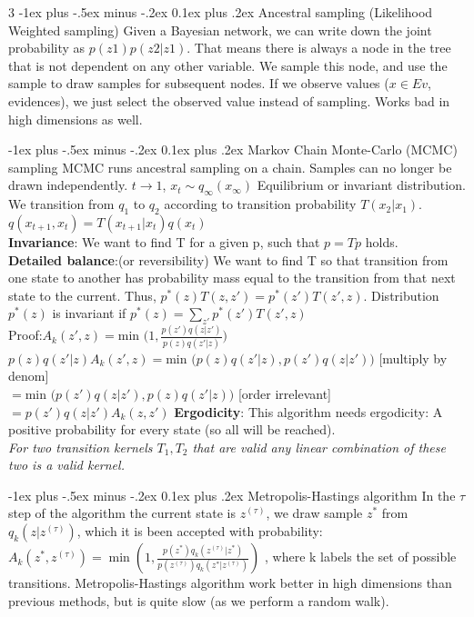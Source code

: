 \documentclass[a4paper,landscape]{amsmlaj}
\makeatletter
\renewcommand{\subsection}{\@startsection{subsection}{2}{0mm}
	{-1ex plus -.5ex minus -.2ex}
	{0.1ex plus .2ex}
	{\normalfont\normalsize\bfseries}}
\makeatother
\begin{document}
\begin{multicols*}{3}
\subsection{Ancestral sampling (Likelihood Weighted sampling)}
Given a Bayesian network, we can write down the joint probability as
$p(z1)p(z2|z1)$. That means there is always a node in the tree that is not
dependent on any other variable. We sample this node, and use the sample to draw
samples for subsequent nodes. If we observe values ($x \in Ev$, evidences), we
just select the observed value instead of sampling. Works bad in high dimensions
as well.

\subsection{Markov Chain Monte-Carlo (MCMC) sampling}
MCMC runs ancestral sampling on a chain. Samples can no longer be drawn
independently. $t \to 1$, $x_t \sim q_{\infty}(x_{\infty})$ Equilibrium or
invariant distribution. We transition from $q_1$ to $q_2$ according to
transition probability $T(x_2|x_1)$.\\
$q(x_{t+1}, x_t) = T(x_{t+1}|x_t)q(x_t)$\\
\textbf{Invariance}:
We want to find T for a given p, such that $p = T p$ holds.\\
\textbf{Detailed balance}:(or reversibility) We want to find T so that
transition from one state to another has probability mass equal to the
transition from that next state to the current. Thus, $p^*(z)T(z,z') =
p^*(z')T(z',z)$. Distribution $p^*(z)$ is invariant if
$p^*(z)=\sum_{z'}p^*(z')T(z',z)$\\
Proof:$A_k(z',z) = \text{min }\big( 1,
\frac{p(z')q(z|z')}{p(z)q(z'|z)} \big)$\\
$p(z)q(z'|z)A_k(z',z) = \text{min } \big( p(z)q(z'|z),p(z')q(z|z') \big)$ [multiply by denom]\\
$= \text{min }\big(p(z')q(z|z'), p(z)q(z'|z) \big)$ [order irrelevant]\\
$= p(z')q(z|z')A_k(z,z')$
\textbf{Ergodicity}:
This algorithm needs ergodicity: A positive probability for every state (so all
will be reached).\\
\textit{For two transition kernels $T_1, T_2$ that are valid any linear
combination of these two is a valid kernel.}

\subsection{Metropolis-Hastings algorithm}
In the $\tau$ step of the algorithm the current state is $z^{(\tau)}$, we draw
sample $z^*$ from $q_k(z|z^{(\tau)})$, which it is been accepted with
probability:
$ A_k(z^*,z^{(\tau)}) =\min (1, \frac{p(z^*)q_k(z^{(\tau)}|z^*)}{p(z^{(\tau)}) q_k(z^*|z^{(\tau)})})$
, where k labels the set of possible transitions. Metropolis-Hastings algorithm
work better in high dimensions than previous methods, but is quite slow (as we
perform a random walk).


\end{multicols*}
\end{document}
